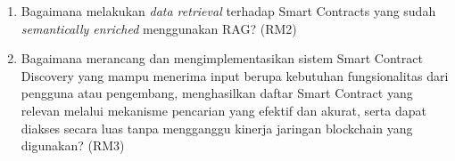 \begin{enumerate}
  \item Bagaimana melakukan \textit{data retrieval} terhadap Smart Contracts yang sudah \textit{semantically enriched} menggunakan RAG? (RM2)

  \item Bagaimana merancang dan mengimplementasikan sistem Smart Contract Discovery yang mampu menerima input berupa kebutuhan fungsionalitas dari pengguna atau pengembang, menghasilkan daftar Smart Contract yang relevan melalui mekanisme pencarian yang efektif dan akurat, serta dapat diakses secara luas tanpa mengganggu kinerja jaringan blockchain yang digunakan? (RM3)

  

\end{enumerate}



